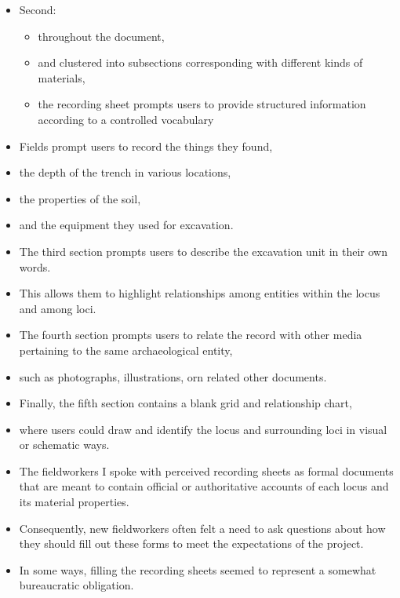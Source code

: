 \documentclass{article}
\begin{document}
\begin{itemize}
  \item Second:
  \begin{itemize}
    \item throughout the document,
    \item and clustered into subsections corresponding with different kinds of materials,
    \item the recording sheet prompts users to provide structured information according to a controlled vocabulary
  \end{itemize}
  \item Fields prompt users to record the things they found,
  \item the depth of the trench in various locations,
  \item the properties of the soil,
  \item and the equipment they used for excavation.\\
  
  \item The third section prompts users to describe the excavation unit in their own words.
  \item This allows them to highlight relationships among entities within the locus and among loci.\\
  
  \item The fourth section prompts users to relate the record with other media pertaining to the same archaeological entity,
  \item such as photographs, illustrations, orn related other documents.\\
  
  \item Finally, the fifth section contains a blank grid and relationship chart,
  \item where users could draw and identify the locus and surrounding loci in visual or schematic ways.\\
  
  \item The fieldworkers I spoke with perceived recording sheets as formal documents that are meant to contain official or authoritative accounts of each locus and its material properties.
  \item Consequently, new fieldworkers often felt a need to ask questions about how they should fill out these forms to meet the expectations of the project.
  \item In some ways, filling the recording sheets seemed to represent a somewhat bureaucratic obligation.\\
  

\end{itemize}
\end{document}
